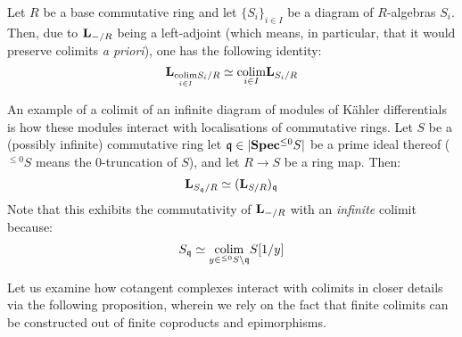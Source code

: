                 \begin{remark} \label{remark: cotangent_complexes_and_colimits}
                    Let $R$ be a base commutative ring and let $\{S_i\}_{i \in I}$ be a diagram of $R$-algebras $S_i$. Then, due to $\mathbf{L}_{-/R}$ being a left-adjoint (which means, in particular, that it would preserve colimits \textit{a priori}), one has the following identity:
                        $$\mathbf{L}_{\underset{i \in I}{\operatorname{colim}} S_i/R} \simeq \underset{i \in I}{\operatorname{colim}} \mathbf{L}_{S_i/R}$$
                \end{remark}
                \begin{example} \label{example: cotangent_complexes_and_localisations}
                    An example of a colimit of an infinite diagram of modules of K\"ahler differentials is how these modules interact with localisations of commutative rings. Let $S$ be a (possibly infinite) commutative ring let $\mathfrak{q} \in |\mathbf{Spec} {}^{\leq 0}S|$ be a prime ideal thereof (${}^{\leq 0}S$ means the $0$-truncation of $S$), and let $R \to S$ be a ring map. Then:
                        $$\mathbf{L}_{S_{\mathfrak{q}}/R} \simeq (\mathbf{L}_{S/R})_{\mathfrak{q}}$$
                    Note that this exhibits the commutativity of $\mathbf{L}_{-/R}$ with an \textit{infinite} colimit because:
                        $$S_{\mathfrak{q}} \simeq \underset{y \in {}^{\leq 0}S \setminus \mathfrak{q}}{\operatorname{colim}} S[1/y]$$
                \end{example}
                Let us examine how cotangent complexes interact with colimits in closer details via the following proposition, wherein we rely on the fact that finite colimits can be constructed out of finite coproducts and epimorphisms.
